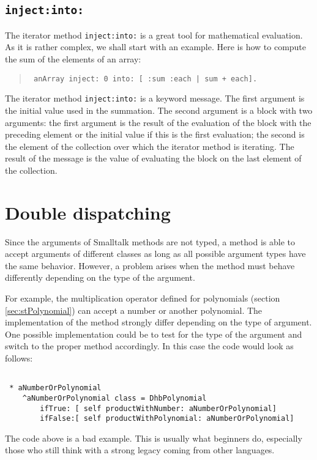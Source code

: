 \documentclass[twoside]{book}
\begin{document}
\subsection{\tt inject:into:}
\label{sec:injectinto} The iterator method {\tt inject:into:} is a
great tool for mathematical evaluation. As it is rather complex,
we shall start with an example. Here is how to compute the sum of
the elements of an array:
\begin{quote}
\begin{verbatim}
 anArray inject: 0 into: [ :sum :each | sum + each].
\end{verbatim}
\end{quote}
The iterator method {\tt inject:into:} is a keyword message. The
first argument is the initial value used in the summation. The
second argument is a  block with two arguments: the first
argument is the result of the evaluation of the  block with
the preceding element or the initial value if this is the first
evaluation; the second is the element of the collection over which
the iterator method is iterating. The result of  the message is
the value of evaluating the block on the last element of the
collection.

\section{Double dispatching}
\label{sec:doubledisp} Since the arguments of Smalltalk methods
are not typed, a method is able to accept arguments of different
classes as long as all possible argument types have the same
behavior. However, a problem arises when the method must behave
differently depending on the type of the argument.

For example, the multiplication operator defined for polynomials
(\cf section \ref{sec:stPolynomial}) can accept a number or
another polynomial. The implementation of the method strongly
differ depending on the type of argument. One possible
implementation could be to test for the type of the argument and
switch to the proper method accordingly. In this case the code
would look as follows:
\begin{codeExample}
\begin{verbatim}

 * aNumberOrPolynomial
    ^aNumberOrPolynomial class = DhbPolynomial
        ifTrue: [ self productWithNumber: aNumberOrPolynomial]
        ifFalse:[ self productWithPolynomial: aNumberOrPolynomial]
\end{verbatim}
\end{codeExample}
The code above is a bad example. This is usually what beginners
do, especially those who still think with a strong legacy coming
from other languages.
\end{document}
